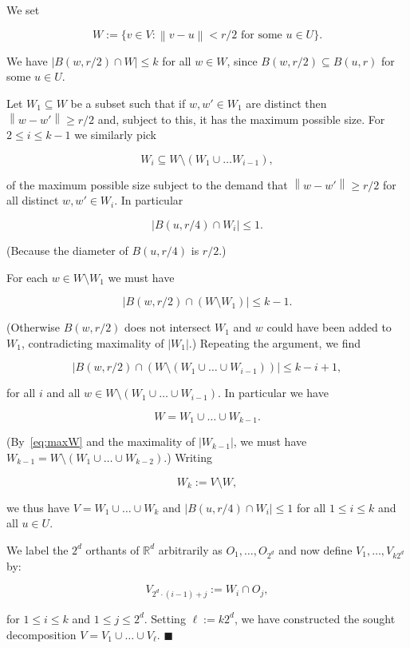 \documentclass[11pt]{article}%
\newenvironment{proof}{\vspace{1ex}\noindent{\bf Proof.}}{\hspace*{\fill}$\blacksquare$\vspace{1ex}}
\newcommand{\eR}[0]{\ensuremath{ \mathbb R}}
\newcommand{\norm}[1]{\ensuremath{\left\|#1\right\|}}
\begin{document}
\begin{proof}
We set 

$$ W := \{ v \in V : \norm{v-u} < r/2 \text{ for some $u \in U$}\}. $$

\noindent
We have $|B( w, r/2 ) \cap W| \leq k$ for all $w \in W$, since 
$B(w,r/2) \subseteq B( u, r)$ for some $u \in U$.

Let $W_1 \subseteq W$ be a subset such that if $w,w'\in W_1$ are distinct then $\norm{w-w'} \geq r/2$
and, subject to this, it has the maximum possible size.
For $2 \leq i \leq k-1$ we similarly pick

$$ W_i \subseteq W \setminus (W_1\cup\dots W_{i-1}), $$

\noindent 
of the maximum possible size subject to the demand that 
$\norm{w-w'} \geq r/2$ for all distinct $w,w'\in W_i$.
In particular

$$|B( u, r/4 ) \cap W_i| \leq 1. $$

\noindent
(Because the diameter of $B(u,r/4)$ is $r/2$.)

For each $w \in W \setminus W_1$ we must have 

$$|B(w,r/2) \cap (W\setminus W_1)| \leq k-1. $$

\noindent
(Otherwise $B(w,r/2)$ does not intersect $W_1$ and $w$ could have been added to $W_1$, contradicting 
maximality of $|W_1|$.) Repeating the argument, we find

\begin{equation}\label{eq:maxW} 
|B(w,r/2)\cap (W\setminus (W_1\cup\dots\cup W_{i-1}))| \leq k-i+1,  
\end{equation}

\noindent
for all $i$ and all $w\in W \setminus (W_1\cup\dots\cup W_{i-1})$.
In particular we have 

$$ W = W_1 \cup \dots \cup W_{k-1}. $$

\noindent
(By~\eqref{eq:maxW} and the maximality of $|W_{k-1}|$, we must have 
$W_{k-1} = W \setminus (W_1\cup\dots\cup W_{k-2})$.)
Writing 

$$ W_k := V \setminus W,$$ 

\noindent 
we thus have
$V = W_1\cup\dots\cup W_k$ and $|B( u, r/4 ) \cap W_i| \leq 1$
for all $1\leq i \leq k$ and all $u \in U$. 

We label the $2^d$ orthants of $\eR^d$ arbitrarily 
as $O_1,\dots,O_{2^d}$ and now define $V_1,\dots,V_{k2^d}$ by:

$$ V_{2^d\cdot(i-1) + j}  := W_i \cap O_j, $$

\noindent
for $1 \leq i \leq k$ and $1\leq j \leq 2^d$. Setting $\ell := k2^d$, we have constructed 
the sought decomposition $V = V_1\cup\dots\cup V_\ell$.
\end{proof}
\end{document}
